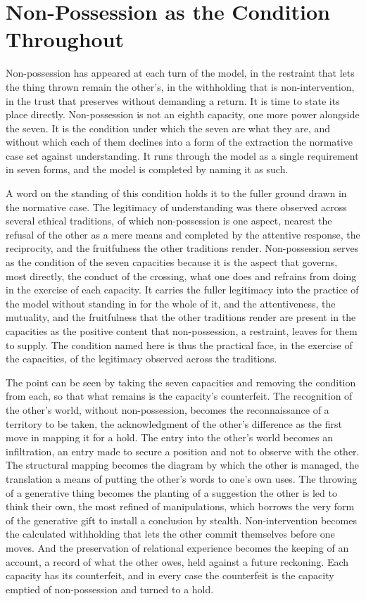 \section{Non-Possession as the Condition Throughout}
\label{p27:sec:nonpossession}

\noindent
Non-possession has appeared at each turn of the model, in the restraint that lets the thing thrown remain the other's, in the withholding that is non-intervention, in the trust that preserves without demanding a return. It is time to state its place directly. Non-possession is not an eighth capacity, one more power alongside the seven. It is the condition under which the seven are what they are, and without which each of them declines into a form of the extraction the normative case set against understanding. It runs through the model as a single requirement in seven forms, and the model is completed by naming it as such.

A word on the standing of this condition holds it to the fuller ground drawn in the normative case. The legitimacy of understanding was there observed across several ethical traditions, of which non-possession is one aspect, nearest the refusal of the other as a mere means and completed by the attentive response, the reciprocity, and the fruitfulness the other traditions render. Non-possession serves as the condition of the seven capacities because it is the aspect that governs, most directly, the conduct of the crossing, what one does and refrains from doing in the exercise of each capacity. It carries the fuller legitimacy into the practice of the model without standing in for the whole of it, and the attentiveness, the mutuality, and the fruitfulness that the other traditions render are present in the capacities as the positive content that non-possession, a restraint, leaves for them to supply. The condition named here is thus the practical face, in the exercise of the capacities, of the legitimacy observed across the traditions.

The point can be seen by taking the seven capacities and removing the condition from each, so that what remains is the capacity's counterfeit. The recognition of the other's world, without non-possession, becomes the reconnaissance of a territory to be taken, the acknowledgment of the other's difference as the first move in mapping it for a hold. The entry into the other's world becomes an infiltration, an entry made to secure a position and not to observe with the other. The structural mapping becomes the diagram by which the other is managed, the translation a means of putting the other's words to one's own uses. The throwing of a generative thing becomes the planting of a suggestion the other is led to think their own, the most refined of manipulations, which borrows the very form of the generative gift to install a conclusion by stealth. Non-intervention becomes the calculated withholding that lets the other commit themselves before one moves. And the preservation of relational experience becomes the keeping of an account, a record of what the other owes, held against a future reckoning. Each capacity has its counterfeit, and in every case the counterfeit is the capacity emptied of non-possession and turned to a hold.


